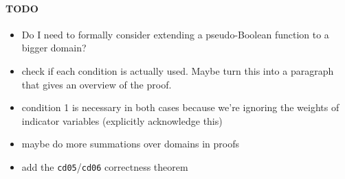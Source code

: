 \documentclass[runningheads]{llncs}
\begin{document}
\paragraph{TODO}
\begin{itemize}
\item Do I need to formally consider extending a pseudo-Boolean function to a
  bigger domain?
\item check if each condition is actually used. Maybe turn this into a paragraph
  that gives an overview of the proof.
\item condition 1 is necessary in both cases because we're ignoring the weights
  of indicator variables (explicitly acknowledge this)
\item maybe do more summations over domains in proofs
\item add the \texttt{cd05}/\texttt{cd06} correctness theorem
\end{itemize}



\end{document}
